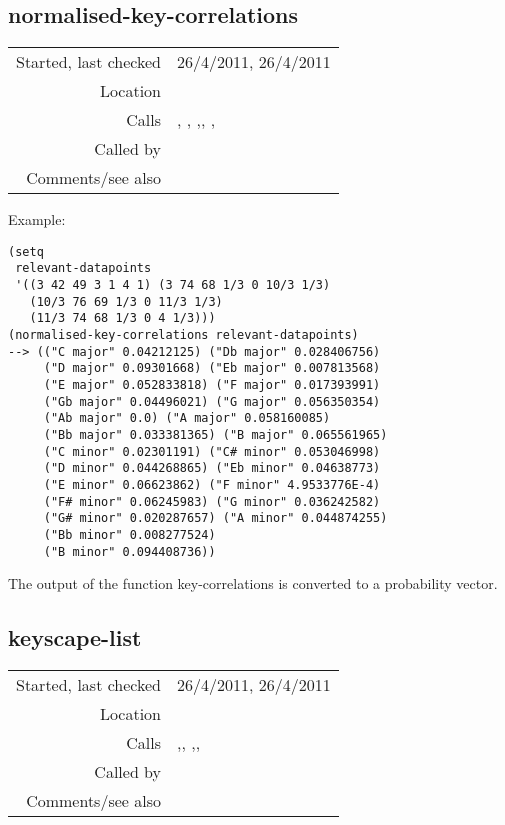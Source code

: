 \subsection*{normalised-key-correlations}\label{fun:normalised-key-correlations}

\vspace{0.3cm}
\begin{tabular}{r|p{8cm}}
Started, last checked & 26/4/2011, 26/4/2011 \\
Location & \nameref{sec:keyscape} \\
Calls & \nameref{fun:add-to-list}, \nameref{fun:fibonacci-list}, \nameref{fun:key-correlations},\newline \nameref{fun:multiply-list-by-constant}, \nameref{fun:my-last},\newline \nameref{fun:nth-list-of-lists} \\
Called by & \nameref{fun:keyscape-list} \\
Comments/see also & 
\end{tabular}

\vspace{0.5cm}
\noindent Example:
\begin{verbatim}
(setq
 relevant-datapoints
 '((3 42 49 3 1 4 1) (3 74 68 1/3 0 10/3 1/3)
   (10/3 76 69 1/3 0 11/3 1/3)
   (11/3 74 68 1/3 0 4 1/3)))
(normalised-key-correlations relevant-datapoints)
--> (("C major" 0.04212125) ("Db major" 0.028406756)
     ("D major" 0.09301668) ("Eb major" 0.007813568)
     ("E major" 0.052833818) ("F major" 0.017393991)
     ("Gb major" 0.04496021) ("G major" 0.056350354)
     ("Ab major" 0.0) ("A major" 0.058160085)
     ("Bb major" 0.033381365) ("B major" 0.065561965)
     ("C minor" 0.02301191) ("C# minor" 0.053046998)
     ("D minor" 0.044268865) ("Eb minor" 0.04638773)
     ("E minor" 0.06623862) ("F minor" 4.9533776E-4)
     ("F# minor" 0.06245983) ("G minor" 0.036242582)
     ("G# minor" 0.020287657) ("A minor" 0.044874255)
     ("Bb minor" 0.008277524)
     ("B minor" 0.094408736))
\end{verbatim}

\noindent The output of the function key-correlations
is converted to a probability vector.


\subsection*{keyscape-list}\label{fun:keyscape-list}

\vspace{0.3cm}
\begin{tabular}{r|p{8cm}}
Started, last checked & 26/4/2011, 26/4/2011 \\
Location & \nameref{sec:keyscape} \\
Calls & \nameref{fun:append-offtimes},\newline \nameref{fun:datapoints-sounding-between}, \nameref{fun:max-item},\newline \nameref{fun:normalised-key-correlations}, \nameref{fun:nth-list-of-lists} \\
Called by & \\
Comments/see also & 
\end{tabular}


